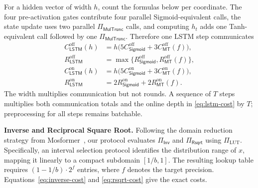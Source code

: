 \documentclass[journal]{IEEEtran}
\theoremstyle{definition}
\theoremstyle{plain}
\newcommand{\MulTr}{\Pi_{\mathsf{MulTrunc}}}
\begin{document}
For a hidden vector of width $h$, count the formulas below per coordinate.
The four pre-activation gates contribute four parallel Sigmoid-equivalent
calls, the state update uses two parallel $\MulTr$ calls, and computing
$h_t$ adds one Tanh-equivalent call followed by one $\MulTr$. Therefore one
LSTM step communicates
\begin{equation}
\begin{aligned}
C^{\mathrm{off}}_{\mathsf{LSTM}}(h)
 &=h\bigl(5C^{\mathrm{off}}_{\mathsf{Sigmoid}}
          +3C^{\mathrm{off}}_{\mathsf{MT}}(f)\bigr),\\
R^{\mathrm{off}}_{\mathsf{LSTM}}
 &=\max\{R^{\mathrm{off}}_{\mathsf{Sigmoid}},
          R^{\mathrm{off}}_{\mathsf{MT}}(f)\},\\
C^{\mathrm{on}}_{\mathsf{LSTM}}(h)
 &=h\bigl(5C^{\mathrm{on}}_{\mathsf{Sigmoid}}
          +3C^{\mathrm{on}}_{\mathsf{MT}}(f)\bigr),\\
R^{\mathrm{on}}_{\mathsf{LSTM}}
 &=2R^{\mathrm{on}}_{\mathsf{Sigmoid}}
   +2R^{\mathrm{on}}_{\mathsf{MT}}(f).
\end{aligned}
\label{eq:lstm-cost}
\end{equation}
The width multiplies communication but not rounds. A sequence of $T$ steps
multiplies both communication totals and the online depth in
\eqref{eq:lstm-cost} by $T$; preprocessing for all steps remains batchable.

\textbf{Inverse and Reciprocal Square Root.} 
Following the domain reduction strategy from Mosformer~\cite{Mosformer}, 
our protocol evaluates $\Pi_{\mathsf{Inv}}$ and $\Pi_{\mathsf{Rsqrt}}$
using $\Pi_{\text{LUT}}$. Specifically, an interval 
selection protocol identifies the distribution range of $x$, 
mapping it linearly to a compact subdomain $[1/b, 1]$. The 
resulting lookup table requires $(1 - 1/b) \cdot 2^f$ entries, where $f$
denotes the target precision. Equations~\eqref{eq:inverse-cost} and
\eqref{eq:rsqrt-cost} give the exact costs.

\end{document}
